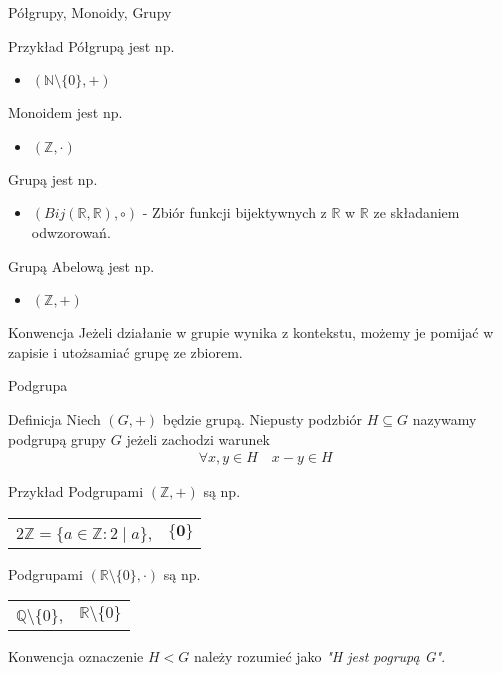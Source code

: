 \documentclass{beamer}
\newcommand{\zero}{\mathbf{0}}
\begin{document}
\begin{frame}{Półgrupy, Monoidy, Grupy}
    \begin{exampleblock}{Przykład}
        Półgrupą jest np.
        \begin{itemize}
            \item $(\mathbb{N}\setminus \{0\} , +)$
        \end{itemize}
        Monoidem jest np. 
        \begin{itemize}
            \item $ ( \mathbb{Z}, \cdot )$
        \end{itemize}
        Grupą jest np.
        \begin{itemize}
            \item $(\textit{Bij}(\mathbb{R},\mathbb{R}), \circ)$ - Zbiór funkcji bijektywnych z $\mathbb{R}$ w $\mathbb{R}$ ze składaniem odwzorowań.
        \end{itemize}
        Grupą Abelową jest np.
        \begin{itemize}
            \item $( \mathbb{Z}, +)$
        \end{itemize}
        
    \end{exampleblock}
    \pause 
    \begin{alertblock}{Konwencja}
        Jeżeli działanie w grupie wynika z kontekstu, możemy je pomijać w zapisie i utożsamiać grupę ze zbiorem.
    \end{alertblock}
\end{frame}

\begin{frame}{Podgrupa}
    \begin{block}{Definicja}
        Niech $(G, +)$ będzie grupą. Niepusty podzbiór $H \subseteq G$ nazywamy podgrupą grupy $G$
        jeżeli zachodzi warunek 
        \begin{align*}
            & \forall x,y \in H  \quad x - y \in H
        \end{align*}
    \end{block}
    \pause 
    \begin{exampleblock}{Przykład}
        Podgrupami  $(\mathbb{Z}, +)$ są np.

        \begin{tabular}{cc}
              $2\mathbb{Z} = \{a \in \mathbb{Z} : 2 \mid a\}$, & 
            $\{ \zero\}$
        \end{tabular}

        Podgrupami  $(\mathbb{R}\setminus \{0\}, \cdot)$ są np.
        
        \begin{tabular}{cc}
            $\mathbb{Q}\setminus \{0\}$, & $\mathbb{R}\setminus \{0\}$
        \end{tabular}
    \end{exampleblock}
    \pause 
    \begin{alertblock}{Konwencja}
        oznaczenie $H < G$ należy rozumieć jako \textit{"H jest pogrupą G"}.
    \end{alertblock}
\end{frame}
\end{document}
